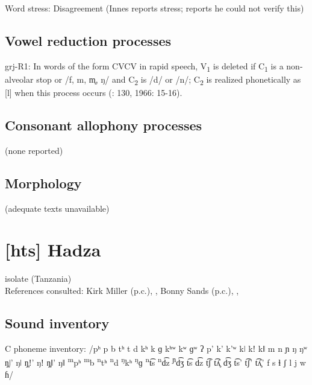 {\begin{appendixdesc}
\item[Word stress:] Disagreement (Innes reports stress; \citealt{Newman1986} reports he could not verify this)
\end{appendixdesc}
\subsection*{Vowel reduction processes}
\begin{appendixdesc}

\item[grj-R1:] In words of the form CVCV in rapid speech, V\textsubscript{1} is deleted if C\textsubscript{1} is a non-alveolar stop or /f, m, m̥, ŋ/ and C\textsubscript{2} is /d/ or /n/; C\textsubscript{2} is realized phonetically as [l] when this process occurs (\citealt{Innes1981}: 130, 1966: 15-16).
\end{appendixdesc}
\subsection*{Consonant allophony processes}
(none reported)

\subsection*{Morphology}

(adequate texts unavailable)
\section*{[hts] Hadza}   %
isolate (Tanzania)\medskip\\
References consulted: Kirk Miller (p.c.), \citet{Sands2013}, Bonny Sands (p.c.), \citet{SandsEtAl1996}, \citet{TuckerEtAl1977}

\subsection*{Sound inventory}
\begin{appendixdesc}

\item[C phoneme inventory:] /pʰ p b tʰ t d kʰ k ɡ kʰʷ kʷ ɡʷ ʔ p’ k’ k’ʷ kǀ kǃ kǁ m n ɲ ŋ ŋʷ ŋ̥ǀ’ ŋǀ ŋ̥ǃ’ ŋǃ ŋ̥ǁ’ ŋǁ \textsuperscript{m}pʰ \textsuperscript{m}b \textsuperscript{n}tʰ \textsuperscript{n}d \textsuperscript{ŋ}kʰ \textsuperscript{ŋ}ɡ \textsuperscript{n}t͡s \textsuperscript{n}d͡z \textsuperscript{ɲ}d͡ʒ t͡s d͡z t͡ʃ t͡ʎ̥ d͡ʒ t͡s’ t͡ʃ’ t͡ʎ̥’ f s ɬ ʃ l j w ɦ/


\end{appendixdesc}}
